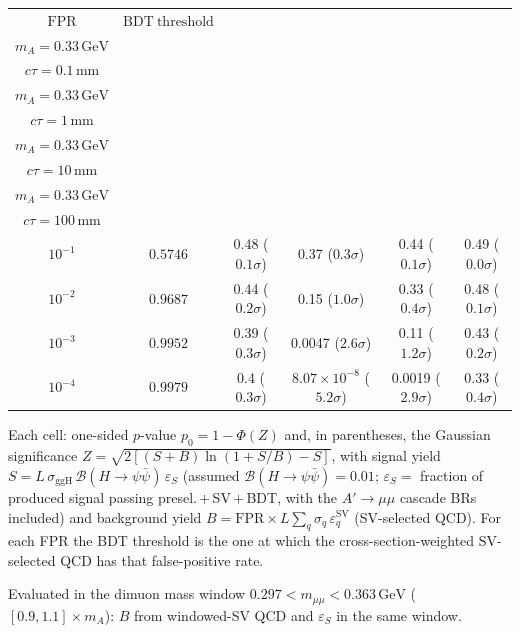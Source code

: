 \documentclass[10pt,a4paper]{article}
\begin{document}
{\begin{tabular}{cccccc}
\toprule
$\mathrm{FPR}$ & $\mathrm{BDT\ threshold}$ & \shortstack{$m_{\pi}=1\,\mathrm{GeV}$\\$m_{A}=0.33\,\mathrm{GeV}$\\$c\tau=0.1\,\mathrm{mm}$} & \shortstack{$m_{\pi}=1\,\mathrm{GeV}$\\$m_{A}=0.33\,\mathrm{GeV}$\\$c\tau=1\,\mathrm{mm}$} & \shortstack{$m_{\pi}=1\,\mathrm{GeV}$\\$m_{A}=0.33\,\mathrm{GeV}$\\$c\tau=10\,\mathrm{mm}$} & \shortstack{$m_{\pi}=1\,\mathrm{GeV}$\\$m_{A}=0.33\,\mathrm{GeV}$\\$c\tau=100\,\mathrm{mm}$} \\
\midrule
$10^{-1}$ & $0.5746$ & 0.48 ($0.1\sigma$) & 0.37 ($0.3\sigma$) & 0.44 ($0.1\sigma$) & 0.49 ($0.0\sigma$)\\
$10^{-2}$ & $0.9687$ & 0.44 ($0.2\sigma$) & 0.15 ($1.0\sigma$) & 0.33 ($0.4\sigma$) & 0.48 ($0.1\sigma$)\\
$10^{-3}$ & $0.9952$ & 0.39 ($0.3\sigma$) & 0.0047 ($2.6\sigma$) & 0.11 ($1.2\sigma$) & 0.43 ($0.2\sigma$)\\
$10^{-4}$ & $0.9979$ & 0.4 ($0.3\sigma$) & $8.07\times10^{-8}$ ($5.2\sigma$) & 0.0019 ($2.9\sigma$) & 0.33 ($0.4\sigma$)\\
\bottomrule
\end{tabular}

{\small Each cell: one-sided $p$-value $p_0=1-\Phi(Z)$ and, in parentheses, the Gaussian significance $Z=\sqrt{2\left[(S{+}B)\ln(1{+}S/B)-S\right]}$, with signal yield $S=L\,\sigma_{\mathrm{ggH}}\,\mathcal{B}(H\to\psi\bar{\psi})\,\varepsilon_S$ (assumed $\mathcal{B}(H\to\psi\bar{\psi})=0.01$; $\varepsilon_S=$ fraction of produced signal passing presel.\,$+$\,SV\,$+$\,BDT, with the $A'\to\mu\mu$ cascade BRs included) and background yield $B=\mathrm{FPR}\times L\sum_q\sigma_q\,\varepsilon_q^{\mathrm{SV}}$ (SV-selected QCD). For each FPR the BDT threshold is the one at which the cross-section-weighted SV-selected QCD has that false-positive rate.}

{\small Evaluated in the dimuon mass window $0.297<m_{\mu\mu}<0.363\,\mathrm{GeV}$ ($[0.9,1.1]\times m_A$): $B$ from windowed-SV QCD and $\varepsilon_S$ in the same window.}

}\clearpage
\end{document}
